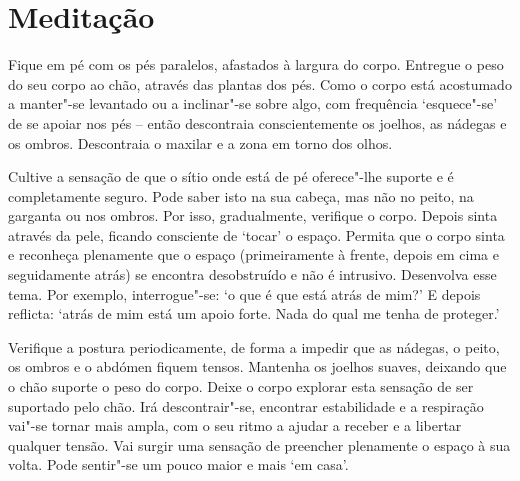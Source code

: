 
\chapter{Meditação}


Fique em pé com os pés paralelos, afastados à largura do corpo. Entregue o peso do seu corpo ao chão, através das plantas dos pés. Como o corpo está acostumado a manter"-se levantado ou a inclinar"-se sobre algo, com frequência `esquece"-se' de se apoiar nos pés -- então descontraia conscientemente os joelhos, as nádegas e os ombros. Descontraia o maxilar e a zona em torno dos olhos.

Cultive a sensação de que o sítio onde está de pé oferece"-lhe suporte e é completamente seguro. Pode saber isto na sua cabeça, mas não no peito, na garganta ou nos ombros. Por isso, gradualmente, verifique o corpo. Depois sinta através da pele, ficando consciente de `tocar' o espaço. Permita que o corpo sinta e reconheça plenamente que o espaço (primeiramente à frente, depois em cima e seguidamente atrás) se encontra desobstruído e não é intrusivo. Desenvolva esse tema. Por exemplo, interrogue"-se: `o que é que está atrás de mim?' E depois reflicta: `atrás de mim está um apoio forte. Nada do qual me tenha de proteger.'

Verifique a postura periodicamente, de forma a impedir que as nádegas, o peito, os ombros e o abdómen fiquem tensos. Mantenha os joelhos suaves, deixando que o chão suporte o peso do corpo. Deixe o corpo explorar esta sensação de ser suportado pelo chão. Irá descontrair"-se, encontrar estabilidade e a respiração vai"-se tornar mais ampla, com o seu ritmo a ajudar a receber e a libertar qualquer tensão. Vai surgir uma sensação de preencher plenamente o espaço à sua volta. Pode sentir"-se um pouco maior e mais `em casa'.

